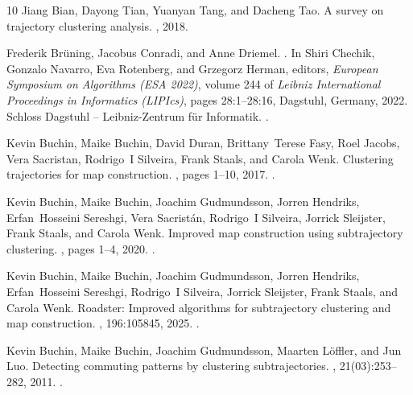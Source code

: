 \documentclass[11pt]{article}
\begin{document}
\begin{thebibliography}{10}
Jiang Bian, Dayong Tian, Yuanyan Tang, and Dacheng Tao.
\newblock A survey on trajectory clustering analysis.
, 2018.

Frederik Br\"{u}ning, Jacobus Conradi, and Anne Driemel.
.
\newblock In Shiri Chechik, Gonzalo Navarro, Eva Rotenberg, and Grzegorz
  Herman, editors, {\em European Symposium on Algorithms (ESA 2022)}, volume
  244 of {\em Leibniz International Proceedings in Informatics (LIPIcs)}, pages
  28:1--28:16, Dagstuhl, Germany, 2022. Schloss Dagstuhl -- Leibniz-Zentrum
  f{\"u}r Informatik.
\newblock \href {https://doi.org/10.4230/LIPIcs.ESA.2022.28}
  {}.

Kevin Buchin, Maike Buchin, David Duran, Brittany~Terese Fasy, Roel Jacobs,
  Vera Sacristan, Rodrigo~I Silveira, Frank Staals, and Carola Wenk.
\newblock Clustering trajectories for map construction.
, pages 1--10, 2017.
\newblock \href {https://doi.org/10.1145/3139958.3139964}
  {}.

Kevin Buchin, Maike Buchin, Joachim Gudmundsson, Jorren Hendriks,
  Erfan~Hosseini Sereshgi, Vera Sacrist{\'a}n, Rodrigo~I Silveira, Jorrick
  Sleijster, Frank Staals, and Carola Wenk.
\newblock Improved map construction using subtrajectory clustering.
, pages 1--4, 2020.
\newblock \href {https://doi.org/10.1145/3423334.3431451}
  {}.

Kevin Buchin, Maike Buchin, Joachim Gudmundsson, Jorren Hendriks,
  Erfan~Hosseini Sereshgi, Rodrigo~I Silveira, Jorrick Sleijster, Frank Staals,
  and Carola Wenk.
\newblock Roadster: Improved algorithms for subtrajectory clustering and map
  construction.
, 196:105845, 2025.
\newblock \href {https://doi.org/10.1016/j.cageo.2024.105845}
  {}.

Kevin Buchin, Maike Buchin, Joachim Gudmundsson, Maarten L{\"o}ffler, and Jun
  Luo.
\newblock Detecting commuting patterns by clustering subtrajectories.
, 21(03):253--282, 2011.
\newblock \href {https://doi.org/10.1142/S0218195911003638}
  {}.


\end{thebibliography}
\end{document}
